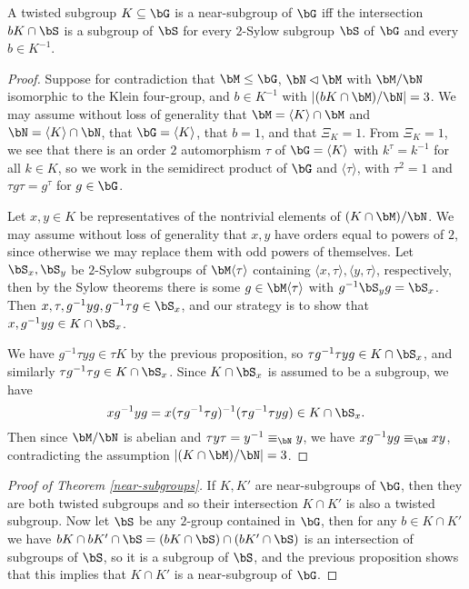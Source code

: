 \begin{prop} A twisted subgroup $K \subseteq \bG$ is a near-subgroup of $\bG$ iff the intersection $bK \cap \bS$ is a subgroup of $\bS$ for every $2$-Sylow subgroup $\bS$ of $\bG$ and every $b \in K^{-1}$.
\end{prop}
\begin{proof} Suppose for contradiction that $\bM \le \bG$, $\bN\lhd \bM$ with $\bM/\bN$ isomorphic to the Klein four-group, and $b \in K^{-1}$ with $|(bK \cap \bM)/\bN| = 3$. We may assume without loss of generality that $\bM = \langle K\rangle \cap \bM$ and $\bN = \langle K\rangle \cap \bN$, that $\bG = \langle K\rangle$, that $b = 1$, and that $\Xi_K = 1$. From $\Xi_K = 1$, we see that there is an order $2$ automorphism $\tau$ of $\bG = \langle K\rangle$ with $k^\tau = k^{-1}$ for all $k \in K$, so we work in the semidirect product of $\bG$ and $\langle \tau \rangle$, with $\tau^2 = 1$ and $\tau g\tau = g^\tau$ for $g \in \bG$.

Let $x,y \in K$ be representatives of the nontrivial elements of $(K \cap \bM)/\bN$. We may assume without loss of generality that $x,y$ have orders equal to powers of $2$, since otherwise we may replace them with odd powers of themselves. Let $\bS_x,\bS_y$ be $2$-Sylow subgroups of $\bM\langle\tau\rangle$ containing $\langle x,\tau\rangle,\langle y,\tau\rangle$, respectively, then by the Sylow theorems there is some $g \in \bM\langle\tau\rangle$ with $g^{-1}\bS_yg = \bS_x$. Then $x,\tau,g^{-1}yg,g^{-1}\tau g \in \bS_x$, and our strategy is to show that $x,g^{-1}yg \in K\cap \bS_x$.

We have $g^{-1}\tau yg \in \tau K$ by the previous proposition, so $\tau g^{-1}\tau y g \in K \cap \bS_x$, and similarly $\tau g^{-1}\tau g \in K\cap \bS_x$. Since $K\cap \bS_x$ is assumed to be a subgroup, we have
\[
xg^{-1}yg = x(\tau g^{-1} \tau g)^{-1} (\tau g^{-1} \tau yg) \in K\cap \bS_x.
\]
Then since $\bM/\bN$ is abelian and $\tau y\tau = y^{-1} \equiv_\bN y$, we have $xg^{-1}yg \equiv_\bN xy$, contradicting the assumption $|(K\cap \bM)/\bN| = 3$.
\end{proof}

\begin{proof}[Proof of Theorem \ref{near-subgroups}] If $K,K'$ are near-subgroups of $\bG$, then they are both twisted subgroups and so their intersection $K \cap K'$ is also a twisted subgroup. Now let $\bS$ be any $2$-group contained in $\bG$, then for any $b \in K\cap K'$ we have $bK\cap bK' \cap \bS = (bK \cap \bS) \cap (bK' \cap \bS)$ is an intersection of subgroups of $\bS$, so it is a subgroup of $\bS$, and the previous proposition shows that this implies that $K\cap K'$ is a near-subgroup of $\bG$.
\end{proof}


